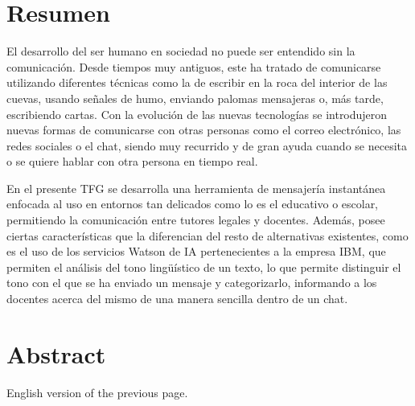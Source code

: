 \chapter{Resumen}
El desarrollo del ser humano en sociedad no puede ser entendido sin la comunicación. Desde tiempos muy antiguos, este ha tratado de comunicarse  utilizando diferentes técnicas como la de escribir en la roca del interior de las cuevas, usando señales de humo, enviando palomas mensajeras o, más tarde, escribiendo cartas. Con la evolución de las nuevas tecnologías se introdujeron nuevas formas de comunicarse con otras personas como el correo electrónico, las redes sociales o el chat, siendo muy recurrido y de gran ayuda cuando se necesita o se quiere hablar con otra persona en tiempo real.

En el presente \acf{TFG} se desarrolla una herramienta de mensajería instantánea enfocada al uso en entornos tan delicados como lo es el educativo o escolar, permitiendo la comunicación entre tutores legales y docentes. Además, posee ciertas características que la diferencian del resto de alternativas existentes, como es el uso de los servicios Watson de \acf{IA} pertenecientes a la empresa IBM, que permiten el análisis del tono lingüístico de un texto, lo que permite distinguir el tono con el que se ha enviado un mensaje y categorizarlo, informando a los docentes acerca del mismo de una manera sencilla dentro de un chat.


\chapter{Abstract}

English version of the previous page.
